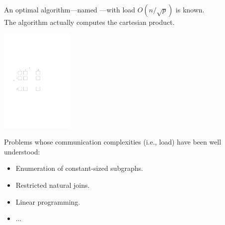 \documentclass{beamer}
\def\vgap{\vspace{5mm}}
\begin{document}
\begin{frame}
\begin{small}
    
    \vgap 
    
    
    An optimal algorithm---named ---with load $O(n/\sqrt{p})$ is known.  \\
    The algorithm actually computes the cartesian product. \\
    
    \begin{center} 
        \includegraphics[height=50mm]{./artwork/cube}
    \end{center}

    
\end{small}
\end{frame}
\begin{frame}
\begin{small}
    
    \vgap 
    
    
    Problems whose communication complexities (i.e., load) have been well understood: 
    
    \begin{itemize} 
        \item Enumeration of constant-sized subgraphs.
        \item Restricted natural joins. 
        \item Linear programming. 
        \item ...
    \end{itemize}


    
\end{small}
\end{frame}
\end{document}
